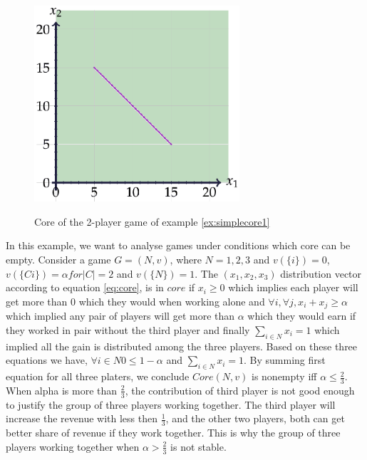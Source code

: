             \begin{figure}
                \begin{center}
                \includegraphics[width=3in]{Figures/excore.eps}\label{fig:coreex1}
                \caption{Core of the 2-player game of example \ref{ex:simplecore1}}
                \end{center}
            \end{figure}


            \begin{example}\label{ex:simplecorealpha}
                In this example, we want to analyse games under conditions which core can be empty. Consider a game $G = (N, v)$,  where $N = {1,2,3}$ and $v(\{i\}) = 0$, $v(\{Ci\}) = \alpha for |C| = 2$ and $v(\{N\}) = 1$. The $(x_1,x_2,x_3)$ distribution vector according to equation \ref{eq:core}, is in $core$ if $x_i \geq 0$ which implies each player will get more than 0 which they would when working alone and $\forall i, \forall j, x_i + x_j \geq \alpha $ which implied any pair of players will get more than $\alpha$ which they would earn if they worked in pair without the third player and finally $\sum_{i \in N} x_i = 1$ which implied all the gain is distributed among the three players. Based on these three equations we have, $\forall i \in N 0 \leqslant 1 - \alpha$ and $\sum_{i \in N} x_i = 1$. By summing first equation for all three platers, we conclude $Core (N,v)$ is nonempty iff $\alpha \leqslant \frac{2}{3}$. When alpha is more than $\frac{2}{3}$, the contribution of third player is not good enough to justify the group of three players working together. The third player will increase the revenue with less then $\frac{1}{3}$, and the other two players, both can get better share of revenue if they work together. This is why the group of three players working together when $\alpha > \frac{2}{3}$ is not stable.
            \end{example}

